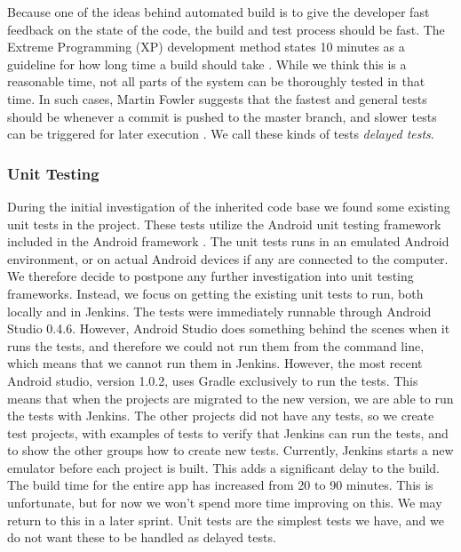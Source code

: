 Because one of the ideas behind automated build is to give the developer fast feedback on the state of the code, the build and test process should be fast. The Extreme Programming (XP) development method states 10 minutes as a guideline for how long time a build should take \parencite{beck2004}. While we think this is a reasonable time, not all parts of the system can be thoroughly tested in that time. In such cases, Martin Fowler suggests that the fastest and general tests should be whenever a commit is pushed to the master branch, and slower tests can be triggered for later execution \parencite{fowlerCI}. We call these kinds of tests \emph{delayed tests}.
\subsubsection{Unit Testing}
During the initial investigation of the inherited code base we found some existing unit tests in the  project. These tests utilize the Android unit testing framework included in the Android framework \parencite{AndroidUnit}. The unit tests runs in an emulated Android environment, or on actual Android devices if any are connected to the computer. We therefore decide to postpone any further investigation into unit testing frameworks. Instead, we focus on getting the existing unit tests to run, both locally and in Jenkins. The tests were immediately runnable through Android Studio 0.4.6. However, Android Studio does something behind the scenes when it runs the tests, and therefore we could not run them from the command line, which means that we cannot run them in Jenkins. However, the most recent Android studio, version 1.0.2, uses Gradle exclusively to run the tests. This means that when the projects are migrated to the new version, we are able to run the tests with Jenkins.
The other projects did not have any tests, so we create test projects, with examples of tests to verify that Jenkins can run the tests, and to show the other groups how to create new tests.
Currently, Jenkins starts a new emulator before each project is built. This adds a significant delay to the build. The build time for the entire app has increased from 20 to 90 minutes. This is unfortunate, but for now we won't spend more time improving on this. We may return to this in a later sprint. Unit tests are the simplest tests we have, and we do not want these to be handled as delayed tests.

